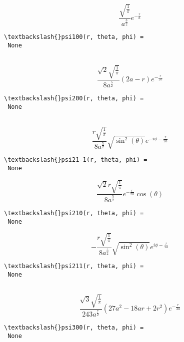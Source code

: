 \documentclass[11pt]{article}
\begin{document}
    $$\frac{\sqrt{\frac{1}{\pi}}}{a^{\frac{3}{2}}} e^{- \frac{r}{a}}$$

    
    \begin{Verbatim}[commandchars=\\\{\}]
\textbackslash{}psi100(r, theta, phi) = 
 None


    \end{Verbatim}

    $$\frac{\sqrt{2} \sqrt{\frac{1}{\pi}}}{8 a^{\frac{5}{2}}} \left(2 a - r\right) e^{- \frac{r}{2 a}}$$

    
    \begin{Verbatim}[commandchars=\\\{\}]
\textbackslash{}psi200(r, theta, phi) = 
 None


    \end{Verbatim}

    $$\frac{r \sqrt{\frac{1}{\pi}}}{8 a^{\frac{5}{2}}} \sqrt{\sin^{2}{\left (\theta \right )}} e^{- i \phi - \frac{r}{2 a}}$$

    
    \begin{Verbatim}[commandchars=\\\{\}]
\textbackslash{}psi21-1(r, theta, phi) = 
 None

    \end{Verbatim}

    $$\frac{\sqrt{2} r \sqrt{\frac{1}{\pi}}}{8 a^{\frac{5}{2}}} e^{- \frac{r}{2 a}} \cos{\left (\theta \right )}$$

    
    \begin{Verbatim}[commandchars=\\\{\}]
\textbackslash{}psi210(r, theta, phi) = 
 None

    \end{Verbatim}

    $$- \frac{r \sqrt{\frac{1}{\pi}}}{8 a^{\frac{5}{2}}} \sqrt{\sin^{2}{\left (\theta \right )}} e^{i \phi - \frac{r}{2 a}}$$

    
    \begin{Verbatim}[commandchars=\\\{\}]
\textbackslash{}psi211(r, theta, phi) = 
 None


    \end{Verbatim}

    $$\frac{\sqrt{3} \sqrt{\frac{1}{\pi}}}{243 a^{\frac{7}{2}}} \left(27 a^{2} - 18 a r + 2 r^{2}\right) e^{- \frac{r}{3 a}}$$

    
    \begin{Verbatim}[commandchars=\\\{\}]
\textbackslash{}psi300(r, theta, phi) = 
 None


    \end{Verbatim}
\end{document}
